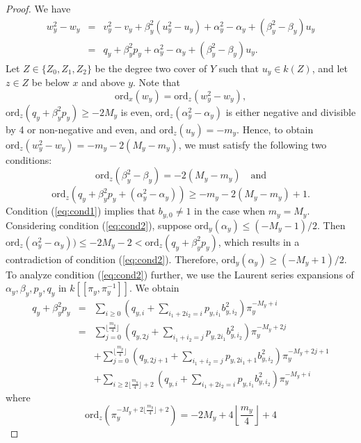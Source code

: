 \documentclass{amsart}
\numberwithin{equation}{section}
\numberwithin{table}{section}
\theoremstyle{plain}
\theoremstyle{definition}
\theoremstyle{remark}
\begin{document}
\begin{proof}
We have
\begin{eqnarray*}
w_y^2-w_y &=& v_y^2-v_y + \beta_y^2 (u_y^2-u_y) + \alpha_y^2-\alpha_y + (\beta_y^2-\beta_y)u_y\\
&=& q_y +\beta_y^2 p_y + \alpha_y^2-\alpha_y + (\beta_y^2-\beta_y)u_y.
\end{eqnarray*}
Let $Z \in\{Z_0,Z_1,Z_2\}$ be the degree two cover of $Y$ such that $u_y\in k(Z)$, and let $z\in Z$ be below $x$ and above $y$. Note that
$$\mathrm{ord}_x(w_y) = \mathrm{ord}_z (w_y^2-w_y),$$
$\mathrm{ord}_z(q_y +\beta_y^2 p_y)\ge -2M_y$ is even, $\mathrm{ord}_z(\alpha_y^2-\alpha_y)$ is either negative and divisible by 4 or non-negative and even, and $\mathrm{ord}_z(u_y) = -m_y$. Hence, to obtain $\mathrm{ord}_z (w_y^2-w_y)=-m_y - 2(M_y-m_y)$, we must satisfy the following two conditions:
\begin{equation}
\label{eq:cond1}
\mathrm{ord}_z(\beta_y^2-\beta_y)=-2(M_y-m_y)\quad\mbox{and}
\end{equation} 
\begin{equation}
\label{eq:cond2}
\mathrm{ord}_z(q_y +\beta_y^2 p_y + (\alpha_y^2-\alpha_y))\ge -m_y - 2(M_y-m_y)+1.
\end{equation}
Condition (\ref{eq:cond1}) implies that $b_{y,0}\ne 1$ in the case when $m_y=M_y$. Considering condition (\ref{eq:cond2}), suppose $\mathrm{ord}_y(\alpha_y)\le (-M_y-1)/2$. Then $\mathrm{ord}_z(\alpha_y^2-\alpha_y))\le -2M_y-2 < \mathrm{ord}_z(q_y +\beta_y^2 p_y)$, which results in a contradiction of condition (\ref{eq:cond2}). Therefore, $\mathrm{ord}_y(\alpha_y)\ge (-M_y+1)/2$. To analyze condition (\ref{eq:cond2}) further, we use the Laurent series expansions of $\alpha_y,\beta_y,p_y,q_y$ in $k[[\pi_y,\pi_y^{-1}]]$. We obtain
\begin{eqnarray*}
q_y +\beta_y^2 p_y  &=& \sum_{i\ge 0} \left( q_{y,i} + \sum_{i_1+2i_2=i} p_{y,i_1}b_{y,i_2}^2 \right) \pi_y^{-M_y+i} \\
&=& \sum_{j=0}^{\lfloor \frac{m_y}{4}\rfloor }  \left( q_{y,2j} + \sum_{i_1+i_2=j} p_{y,2i_1}b_{y,i_2}^2 \right) \pi_y^{-M_y+2j}\\
&&+ \sum_{j=0}^{\lfloor \frac{m_y}{4}\rfloor}  \left( q_{y,2j+1} + \sum_{i_1+i_2=j} p_{y,2i_1+1}b_{y,i_2}^2 \right) \pi_y^{-M_y+2j+1}\\
&&+ \sum_{i\ge 2 \lfloor \frac{m_y}{4}\rfloor + 2} \left( q_{y,i} + \sum_{i_1+2i_2=i} p_{y,i_1}b_{y,i_2}^2 \right) \pi_y^{-M_y+i} 
\end{eqnarray*}
where 
$$\mathrm{ord}_z(\pi_y^{-M_y+2 \lfloor \frac{m_y}{4}\rfloor + 2}) = -2M_y+4 \textstyle{\left\lfloor \frac{m_y}{4}\right\rfloor} + 4
$$
\end{proof}
\end{document}
